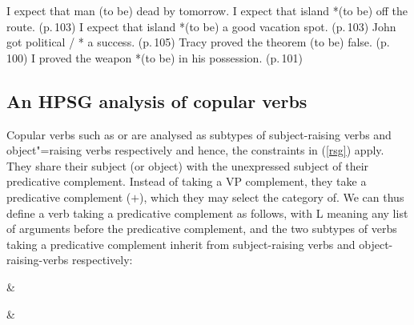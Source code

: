 \eal
\label{ex-expect}
\ex I expect that man (to be) dead  by tomorrow. \citep[]{PollardandSag1994}
\ex I expect that island *(to be) off the route. (p.\,103)
\ex I expect that island *(to be) a good vacation spot. (p.\,103)
\zl
\ea
\label{ex-get}
John got political / * a success. (p.\,105)	
\z
\eal
\label{ex-prove}
\ex Tracy proved the theorem (to be) false. (p.\,100)
\ex I proved the weapon *(to be) in his possession.	(p.\,101)
\zl
	


\subsection{An HPSG analysis of copular verbs}
\label{control-sec-copula-verbs}
	
Copular verbs such as  or  are analysed as subtypes of subject-raising verbs
and object"=raising verbs respectively and hence, the constraints in (\ref{rsg}) apply. They share their subject (or object) with the
unexpressed subject of their predicative complement. Instead of taking a VP complement, they take a
predicative complement (\prd $+$), which they may select the category of.  We can thus define a verb taking a predicative complement
as follows, with L meaning any list of arguments before the predicative complement, and the two subtypes of verbs taking a predicative complement inherit from subject-raising verbs and object-raising-verbs respectively:

\eal
\label{ex-subj-pred-v}
\ex {} \impl  {}
\ex {} \impl {} \& 

\ex {} \impl  {} \& 
\zl

